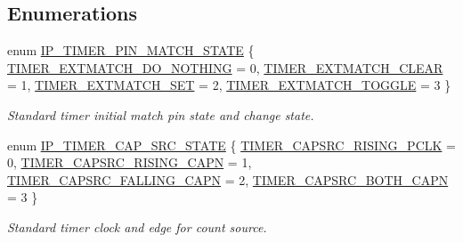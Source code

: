 \subsection*{Enumerations}
\begin{DoxyCompactItemize}
\item 
enum \hyperlink{group___t_i_m_e_r__18_x_x__43_x_x_ga29caa12f43ff996d3ebbf7d5f9036f2c}{I\+P\+\_\+\+T\+I\+M\+E\+R\+\_\+\+P\+I\+N\+\_\+\+M\+A\+T\+C\+H\+\_\+\+S\+T\+A\+TE} \{ \hyperlink{group___t_i_m_e_r__18_x_x__43_x_x_gga29caa12f43ff996d3ebbf7d5f9036f2caee61101edb52ea5ce70b74a41766467f}{T\+I\+M\+E\+R\+\_\+\+E\+X\+T\+M\+A\+T\+C\+H\+\_\+\+D\+O\+\_\+\+N\+O\+T\+H\+I\+NG} = 0, 
\hyperlink{group___t_i_m_e_r__18_x_x__43_x_x_gga29caa12f43ff996d3ebbf7d5f9036f2ca0fc4886f55eb7bcfda4baea4c08c551a}{T\+I\+M\+E\+R\+\_\+\+E\+X\+T\+M\+A\+T\+C\+H\+\_\+\+C\+L\+E\+AR} = 1, 
\hyperlink{group___t_i_m_e_r__18_x_x__43_x_x_gga29caa12f43ff996d3ebbf7d5f9036f2ca059e5dedfdab474ecafba9827116f5ff}{T\+I\+M\+E\+R\+\_\+\+E\+X\+T\+M\+A\+T\+C\+H\+\_\+\+S\+ET} = 2, 
\hyperlink{group___t_i_m_e_r__18_x_x__43_x_x_gga29caa12f43ff996d3ebbf7d5f9036f2caa7b4fdd349721213351a4bba29472215}{T\+I\+M\+E\+R\+\_\+\+E\+X\+T\+M\+A\+T\+C\+H\+\_\+\+T\+O\+G\+G\+LE} = 3
 \}\begin{DoxyCompactList}\small\item\em Standard timer initial match pin state and change state. \end{DoxyCompactList}
\item 
enum \hyperlink{group___t_i_m_e_r__18_x_x__43_x_x_ga1ceafbd6fb46418e292878934efb63aa}{I\+P\+\_\+\+T\+I\+M\+E\+R\+\_\+\+C\+A\+P\+\_\+\+S\+R\+C\+\_\+\+S\+T\+A\+TE} \{ \hyperlink{group___t_i_m_e_r__18_x_x__43_x_x_gga1ceafbd6fb46418e292878934efb63aaa9c110041557616b65aff5c20d03ae8be}{T\+I\+M\+E\+R\+\_\+\+C\+A\+P\+S\+R\+C\+\_\+\+R\+I\+S\+I\+N\+G\+\_\+\+P\+C\+LK} = 0, 
\hyperlink{group___t_i_m_e_r__18_x_x__43_x_x_gga1ceafbd6fb46418e292878934efb63aaae17c344c6e80cc8f2a0e6f5c4bc32269}{T\+I\+M\+E\+R\+\_\+\+C\+A\+P\+S\+R\+C\+\_\+\+R\+I\+S\+I\+N\+G\+\_\+\+C\+A\+PN} = 1, 
\hyperlink{group___t_i_m_e_r__18_x_x__43_x_x_gga1ceafbd6fb46418e292878934efb63aaaf07e78a49ce7829f3a7975196aeb5a5c}{T\+I\+M\+E\+R\+\_\+\+C\+A\+P\+S\+R\+C\+\_\+\+F\+A\+L\+L\+I\+N\+G\+\_\+\+C\+A\+PN} = 2, 
\hyperlink{group___t_i_m_e_r__18_x_x__43_x_x_gga1ceafbd6fb46418e292878934efb63aaaa09ba96751f9c750f9257050053ccb62}{T\+I\+M\+E\+R\+\_\+\+C\+A\+P\+S\+R\+C\+\_\+\+B\+O\+T\+H\+\_\+\+C\+A\+PN} = 3
 \}\begin{DoxyCompactList}\small\item\em Standard timer clock and edge for count source. \end{DoxyCompactList}
\end{DoxyCompactItemize}
